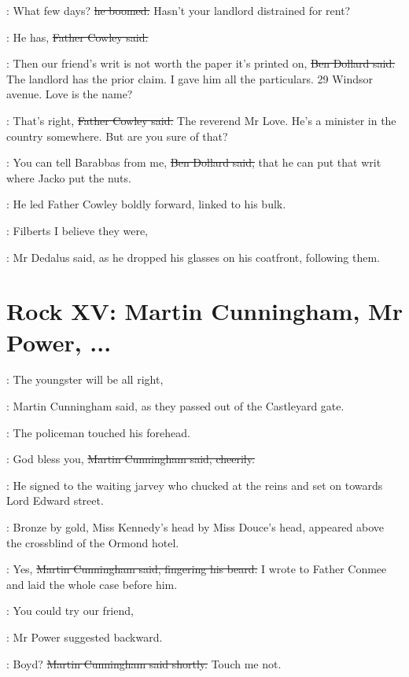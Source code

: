 \dollard:
What few days?
\sout{he boomed.}
Hasn't your landlord distrained for rent?

\cowley:
He has,
\sout{Father Cowley said.}

\dollard:
Then our friend's writ is not worth the paper it's printed on,
\sout{Ben Dollard said.}
The landlord has the prior claim.
I gave him all the particulars.
29 Windsor avenue.
Love is the name?

\cowley:
That's right,
\sout{Father Cowley said.}
The reverend Mr Love.
He's a minister in the country somewhere.
But are you sure of that?

\dollard:
You can tell Barabbas from me,
\sout{Ben Dollard said,}
that he can put that writ where Jacko put the nuts.

:
He led Father Cowley boldly forward,
linked to his bulk.

\simon:
Filberts I believe they were,

:
Mr Dedalus said,
as he dropped his
glasses on his coatfront,
following them.


\section*{Rock XV: Martin Cunningham, Mr Power, ...}


\cunningham:
The youngster will be all right,

:
Martin Cunningham said,
as they passed
out of the Castleyard gate.

:
The policeman touched his forehead.

\cunningham:
God bless you,
\sout{Martin Cunningham said, cheerily.}

:
He signed to the waiting jarvey
who chucked at the reins
and set on towards Lord Edward street.

\begin{mdframed}
    :
    Bronze by gold,
    Miss Kennedy's head by Miss Douce's head,
    appeared above
    the crossblind of the Ormond hotel.
\end{mdframed}

\cunningham:
Yes,
\sout{Martin Cunningham said,
fingering his beard.}
I wrote to Father Conmee and laid the whole case before him.

\power:
You could try our friend,

:
Mr Power suggested backward.

\cunningham:
Boyd?
\sout{Martin Cunningham said shortly.}
Touch me not.

